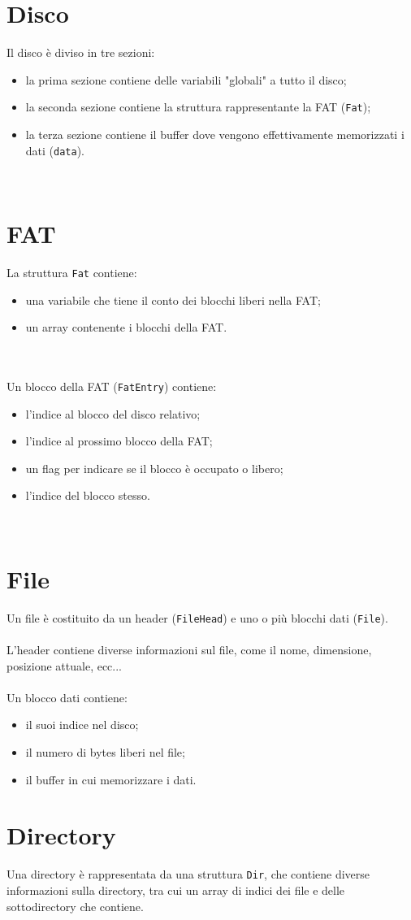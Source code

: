 \documentclass[12pt,a4paper,titlepage]{report}
\begin{document}
	\section{Disco}
	Il disco è diviso in tre sezioni:
	\begin{itemize}
		\item la prima sezione contiene delle variabili "globali" a tutto il disco;
		\item la seconda sezione contiene la struttura rappresentante la FAT (\verb|Fat|);
		\item la terza sezione contiene il buffer dove vengono effettivamente memorizzati i dati (\verb|data|).
	\end{itemize}
	\quad\\

	\section{FAT}
	La struttura \verb|Fat| contiene:
	\begin{itemize}
		\item una variabile che tiene il conto dei blocchi liberi nella FAT;
		\item un array contenente i blocchi della FAT.
	\end{itemize}
	\quad\\\\
	Un blocco della FAT (\verb|FatEntry|) contiene:
	\begin{itemize}
		\item l'indice al blocco del disco relativo;
		\item l'indice al prossimo blocco della FAT;
		\item un flag per indicare se il blocco è occupato o libero;
		\item l'indice del blocco stesso.
	\end{itemize}
	\quad\\
	
	\section{File}
	Un file è costituito da un header (\verb|FileHead|) e uno o più blocchi dati (\verb|File|).\\\\
	L'header contiene diverse informazioni sul file, come il nome, dimensione, posizione attuale, ecc...
	\quad\\\\
	Un blocco dati contiene:
	\begin{itemize}
		\item il suoi indice nel disco;
		\item il numero di bytes liberi nel file;
		\item il buffer in cui memorizzare i dati.
	\end{itemize}
	
	
	\section{Directory}
	Una directory è rappresentata da una struttura \verb|Dir|, che contiene diverse informazioni sulla directory, tra cui un array di indici dei file e delle sottodirectory che contiene.
	\quad\\
	
\end{document}
